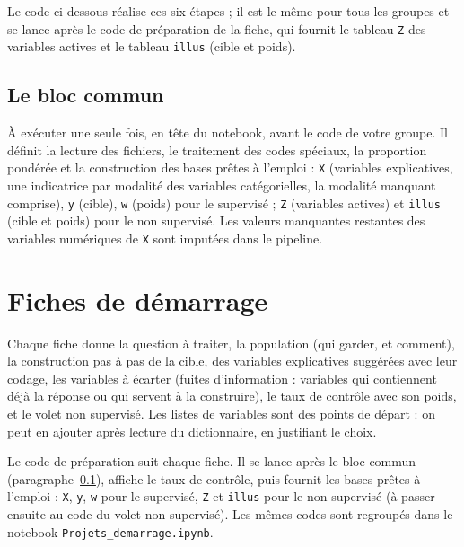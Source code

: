 \documentclass[11pt]{article}
\begin{document}
Le code ci-dessous réalise ces six étapes ; il est le même pour tous les groupes et se lance après le code de préparation de la fiche, qui fournit le tableau \texttt{Z} des variables actives et le tableau \texttt{illus} (cible et poids).


\subsection{Le bloc commun}
\label{sec:bloc}

À exécuter une seule fois, en tête du notebook, avant le code de votre groupe. Il définit la lecture des fichiers, le traitement des codes spéciaux, la proportion pondérée et la construction des bases prêtes à l'emploi : \texttt{X} (variables explicatives, une indicatrice par modalité des variables catégorielles, la modalité \og manquant \fg{} comprise), \texttt{y} (cible), \texttt{w} (poids) pour le supervisé ; \texttt{Z} (variables actives) et \texttt{illus} (cible et poids) pour le non supervisé. Les valeurs manquantes restantes des variables numériques de \texttt{X} sont imputées dans le pipeline.


\section{Fiches de démarrage}
\label{sec:fiches}

Chaque fiche donne la question à traiter, la population (qui garder, et comment), la construction pas à pas de la cible, des variables explicatives suggérées avec leur codage, les variables à écarter (fuites d'information : variables qui contiennent déjà la réponse ou qui servent à la construire), le taux de contrôle avec son poids, et le volet non supervisé. Les listes de variables sont des points de départ : on peut en ajouter après lecture du dictionnaire, en justifiant le choix.

Le code de préparation suit chaque fiche. Il se lance après le bloc commun (paragraphe~\ref{sec:bloc}), affiche le taux de contrôle, puis fournit les bases prêtes à l'emploi : \texttt{X}, \texttt{y}, \texttt{w} pour le supervisé, \texttt{Z} et \texttt{illus} pour le non supervisé (à passer ensuite au code du volet non supervisé). Les mêmes codes sont regroupés dans le notebook \texttt{Projets\_demarrage.ipynb}.
\end{document}
